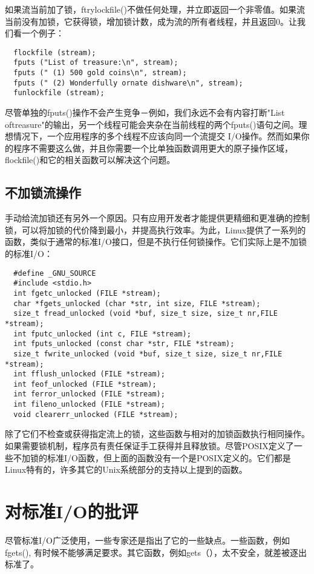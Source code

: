 如果流当前加了锁，ftrylockfile()不做任何处理，并立即返回一个非零值。如果流当前没有加锁，它获得锁，增加锁计数，成为流的所有者线程，并且返回0。让我们看一个例子：
\begin{lstlisting}
  flockfile (stream);
  fputs ("List of treasure:\n", stream);
  fputs (" (1) 500 gold coins\n", stream);
  fputs (" (2) Wonderfully ornate dishware\n", stream);
  funlockfile (stream);
\end{lstlisting}

尽管单独的fputs()操作不会产生竞争－例如，我们永远不会有内容打断"List oftreasure"的输出，另一个线程可能会夹杂在当前线程的两个fputs()语句之间。理想情况下，一个应用程序的多个线程不应该向同一个流提交 I/O操作。然而如果你的程序不需要这么做，并且你需要一个比单独函数调用更大的原子操作区域，flockfile()和它的相关函数可以解决这个问题。

\subsection{不加锁流操作}

手动给流加锁还有另外一个原因。只有应用开发者才能提供更精细和更准确的控制锁，可以将加锁的代价降到最小，并提高执行效率。为此，Linux提供了一系列的函数，类似于通常的标准I/O接口，但是不执行任何锁操作。它们实际上是不加锁的标准I/O：
\begin{lstlisting}
  #define _GNU_SOURCE
  #include <stdio.h>
  int fgetc_unlocked (FILE *stream);
  char *fgets_unlocked (char *str, int size, FILE *stream);
  size_t fread_unlocked (void *buf, size_t size, size_t nr,FILE *stream);
  int fputc_unlocked (int c, FILE *stream);
  int fputs_unlocked (const char *str, FILE *stream);
  size_t fwrite_unlocked (void *buf, size_t size, size_t nr,FILE *stream);
  int fflush_unlocked (FILE *stream);
  int feof_unlocked (FILE *stream);
  int ferror_unlocked (FILE *stream);
  int fileno_unlocked (FILE *stream);
  void clearerr_unlocked (FILE *stream);
\end{lstlisting}

除了它们不检查或获得指定流上的锁，这些函数与相对的加锁函数执行相同操作。如果需要锁机制，程序员有责任保证手工获得并且释放锁。尽管POSIX定义了一些不加锁的标准I/O函数，但上面的函数没有一个是POSIX定义的。它们都是Linux特有的，许多其它的Unix系统部分的支持以上提到的函数。 

\section{对标准I/O的批评}

尽管标准I/O广泛使用，一些专家还是指出了它的一些缺点。一些函数，例如fgets(), 有时候不能够满足要求。其它函数，例如gets（），太不安全，就差被逐出标准了。

